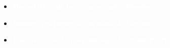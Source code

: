 \begin{frame}
     {
        \begin{itemize}
            \item \textcolor{white}{\LARGE{\textbf{Deep-Dive sur les composantes Passives}}}
            \bigskip
            \item \textcolor{white}{\LARGE{\textbf{Bonnes pratiques de Schéma \& Layout}}}
            \bigskip
            \item \textcolor{white}{\LARGE{\textbf{Comment se déplace un signal sur un PCB}}}
        \end{itemize}
    }
\end{frame}



